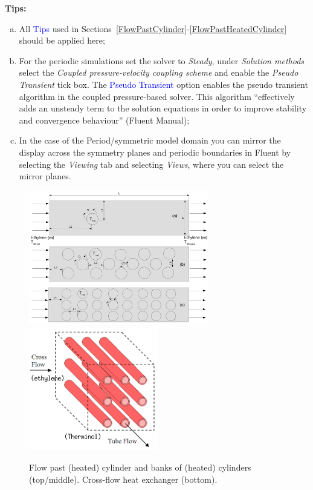 \documentclass[12pts,a4paper,amsmath,amssymb,floatfix]{article}%
\newcommand{\blue}{\textcolor{blue}}
\begin{document}
     \begin{shaded}
        \begin{center} {\bf Tips: } \end{center}
        \begin{enumerate}[a)]
           \item All \blue{Tips} used in Sections~\ref{FlowPastCylinder}-\ref{FlowPastHeatedCylinder} should be applied here;
           \item For the periodic simulations set the solver to {\it Steady}, under {\it Solution methods} select the {\it Coupled pressure-velocity coupling scheme} and enable the {\it Pseudo Transient} tick box. The \blue{Pseudo Transient} option enables the pseudo transient algorithm in the coupled pressure-based solver. This algorithm ``effectively adds an unsteady term to the solution equations in order to improve stability and convergence behaviour'' (Fluent Manual);
           \item In the case of the Period/symmetric model domain you can mirror the display across the symmetry planes and periodic boundaries in Fluent by selecting the {\it Viewing}  tab and selecting {\it Views}, where you can select the mirror planes.
        \end{enumerate}
     \end{shaded}

     \begin{figure}[h]
         \vbox{ \hbox{\hspace{1cm}\includegraphics[width=0.7\textwidth,clip]{./Pics/HeatExchanger_2D.pdf}}
                \hbox{\hspace{3cm}\includegraphics[width=0.5\textwidth,clip]{./Pics/HE_Finned.png}}}
         \caption{Flow past (heated) cylinder and banks of (heated) cylinders (top/middle). Cross-flow heat exchanger (bottom). }\label{HE_FlowPastHeatedCyclinder}
     \end{figure}
\end{document}
